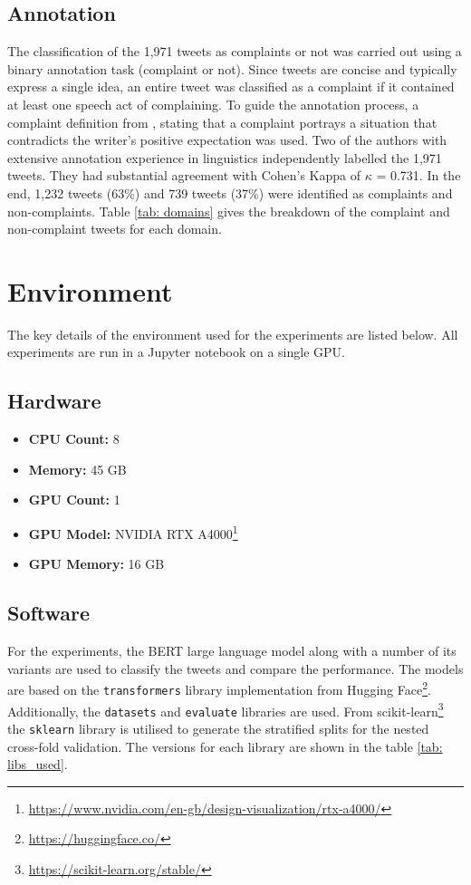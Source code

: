 \subsection{Annotation}
The classification of the 1,971 tweets as complaints or not was carried out using a binary annotation task (complaint or not). Since tweets are concise and typically express a single idea, an entire tweet was classified as a complaint if it contained at least one speech act of complaining. To guide the annotation process, a complaint definition from \cite{olshtain_speechact_1987}, stating that a complaint portrays a situation that contradicts the writer's positive expectation was used. Two of the authors with extensive annotation experience in linguistics independently labelled the 1,971 tweets. They had substantial agreement \cite{artsteinInterCoderAgreementComputational2008} with Cohen's Kappa of $\kappa$ = 0.731. In the end, 1,232 tweets (63\%) and 739 tweets (37\%) were identified as complaints and non-complaints. Table \ref{tab: domains} gives the breakdown of the complaint and non-complaint tweets for each domain.

\section{Environment}

The key details of the environment used for the experiments are listed below. All experiments are run in a Jupyter notebook on a single GPU.
\subsection{Hardware}
\begin{itemize}
    \small
    \item \textbf{CPU Count:} 8
    \item \textbf{Memory:} 45 GB
    \item \textbf{GPU Count:} 1
    \item \textbf{GPU Model:} NVIDIA RTX A4000\footnote{\url{https://www.nvidia.com/en-gb/design-visualization/rtx-a4000/}}
    \item \textbf{GPU Memory:} 16 GB
\end{itemize}

\subsection{Software}
For the experiments, the BERT large language model along with a number of its variants are used to classify the tweets and compare the performance. The models are based on the \texttt{transformers} library implementation from Hugging Face\footnote{\url{https://huggingface.co/}}. Additionally, the \texttt{datasets} and \texttt{evaluate} libraries are used. From scikit-learn\footnote{\url{https://scikit-learn.org/stable/}} the \texttt{sklearn} library is utilised to generate the stratified splits for the nested cross-fold validation. The versions for each library are shown in the table \ref{tab: libs_used}.

